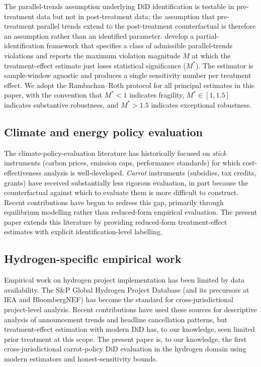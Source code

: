 \documentclass[12pt,a4paper]{article}
\theoremstyle{plain}
\theoremstyle{definition}
\begin{document}
The parallel-trends assumption underlying DiD identification is testable in pre-treatment data but not in post-treatment data; the assumption that pre-treatment parallel trends extend to the post-treatment counterfactual is therefore an assumption rather than an identified parameter. \cite{rambachan2023more} develop a partial-identification framework that specifies a class of admissible parallel-trends violations and reports the maximum violation magnitude $M$ at which the treatment-effect estimate just loses statistical significance ($M^{*}$). The estimator is sample-window agnostic and produces a single sensitivity number per treatment effect. We adopt the Rambachan--Roth protocol for all principal estimates in this paper, with the convention that $M^{*} < 1$ indicates fragility, $M^{*} \in [1, 1.5]$ indicates substantive robustness, and $M^{*} > 1.5$ indicates exceptional robustness.

\subsection{Climate and energy policy evaluation}
\label{sec:lit-policy}

The climate-policy-evaluation literature has historically focused on \emph{stick} instruments (carbon prices, emission caps, performance standards) for which cost-effectiveness analysis is well-developed. \emph{Carrot} instruments (subsidies, tax credits, grants) have received substantially less rigorous evaluation, in part because the counterfactual against which to evaluate them is more difficult to construct. Recent contributions \cite{aldy2017real, bistline2023economic, lyon2023impacts} have begun to redress this gap, primarily through equilibrium modelling rather than reduced-form empirical evaluation. The present paper extends this literature by providing reduced-form treatment-effect estimates with explicit identification-level labelling.

\subsection{Hydrogen-specific empirical work}
\label{sec:lit-hydrogen}

Empirical work on hydrogen project implementation has been limited by data availability. The S\&P Global Hydrogen Project Database (and its precursors at IEA and BloombergNEF) has become the standard for cross-jurisdictional project-level analysis. Recent contributions \cite{hauenstein2024technological, oei2024global, agora2025outlook} have used these sources for descriptive analysis of announcement trends and headline cancellation patterns, but treatment-effect estimation with modern DiD has, to our knowledge, seen limited prior treatment at this scope. The present paper is, to our knowledge, the first cross-jurisdictional carrot-policy DiD evaluation in the hydrogen domain using modern estimators and honest-sensitivity bounds.
\end{document}
